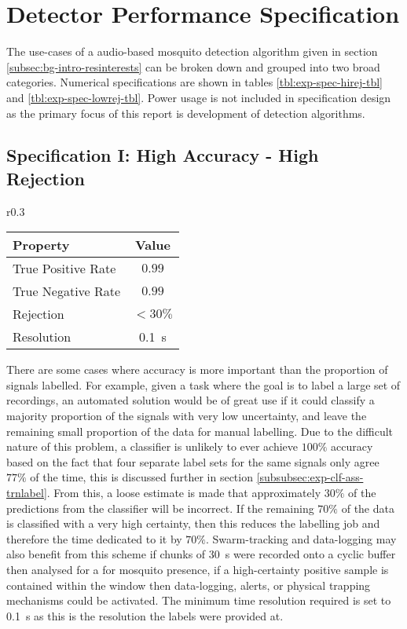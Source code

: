 \section{Detector Performance Specification}
\label{sec:exp-spec}
    The use-cases of a audio-based mosquito detection algorithm given in section \ref{subsec:bg-intro-resinterests} can be broken down and grouped into two broad categories. Numerical specifications are shown in tables \ref{tbl:exp-spec-hirej-tbl} and \ref{tbl:exp-spec-lowrej-tbl}. Power usage is not included in specification design as the primary focus of this report is development of detection algorithms. 
    \subsection{Specification I: High Accuracy - High Rejection}
    \label{subsec:exp-spec-hirej}
        \begin{wraptable}{r}{0.3\textwidth}
            \scriptsize
            \singlespacing
            \centering
                \begin{tabular}{ |l||c| } 
                    \hline
                    Property & Value \\ 
                    \hline
                    \hline
                    True Positive Rate & $0.99$ \\
                    True Negative Rate & $0.99$ \\
                    Rejection & $<30\%$\\
                    Resolution & \SI{0.1}{\second}\\
                    \hline
                \end{tabular}
            \caption{High accuracy - high rejection specifications.}
            \label{tbl:exp-spec-hirej-tbl}
        \end{wraptable}
        There are some cases where accuracy is more important than the proportion of signals labelled. For example, given a task where the goal is to label a large set of recordings, an automated solution would be of great use if it could classify a majority proportion of the signals with very low uncertainty, and leave the remaining small proportion of the data for manual labelling. Due to the difficult nature of this problem, a classifier is unlikely to ever achieve $100\%$ accuracy based on the fact that four separate label sets for the same signals only agree $77\%$ of the time, this is discussed further in section \ref{subsubsec:exp-clf-ass-trnlabel}. From this, a loose estimate is made that approximately $30\%$ of the predictions from the classifier will be incorrect. If the remaining $70\%$ of the data is classified with a very high certainty, then this reduces the labelling job and therefore the time dedicated to it by $70\%$. Swarm-tracking and data-logging may also benefit from this scheme if chunks of \SI{30}{\second} were recorded onto a cyclic buffer then analysed for a for mosquito presence, if a high-certainty positive sample is contained within the window then data-logging, alerts, or physical trapping mechanisms could be activated. The minimum time resolution required is set to \SI{0.1}{\second} as this is the resolution the labels were provided at.  
        
